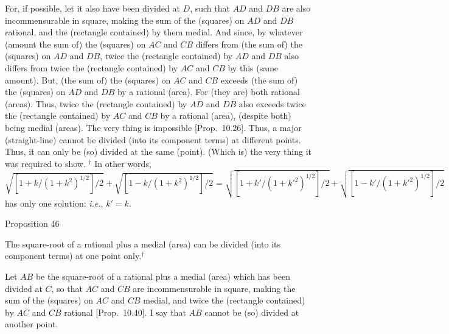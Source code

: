 For, if possible, let it also have been divided at $D$, such that $AD$ and
$DB$ are also incommensurable in square, making the
sum of the (squares) on $AD$ and $DB$ rational, and the (rectangle contained) by them medial. And since, by whatever (amount the sum of)
the (squares) on $AC$ and $CB$ differs from (the sum of) the (squares)
on $AD$ and $DB$, 
twice the (rectangle contained) by $AD$ and $DB$ also differs from
twice the (rectangle contained) by $AC$ and $CB$ by this (same amount). But, (the sum of) the
(squares) on $AC$ and $CB$ exceeds (the sum of) the (squares) on
$AD$ and $DB$ by a rational (area). For (they are) both rational (areas). Thus, twice the
(rectangle contained) by $AD$ and $DB$ also exceeds twice the
(rectangle contained) by $AC$ and $CB$ by a rational (area), (despite both) being medial (areas).
The very thing is impossible [Prop.~10.26].
Thus, a major (straight-line) cannot be divided (into its component terms) at different points. Thus,
it can only be (so) divided at the same (point). (Which is) the very thing it was required to show.
{\footnotesize\noindent$^\dag$ In other words, $\sqrt{[1+k/(1+k^2)^{1/2}]/2} + \sqrt{[1-k/(1+k^2)^{1/2}]/2} =\sqrt{[1+k'/(1+k'^2)^{1/2}]/2} + \sqrt{[1-k'/(1+k'^2)^{1/2}]/2}$ has only one solution: {\em i.e.}, $k'=k$.}


\begin{center}
{\large Proposition 46}
\end{center}
The square-root of a rational plus a  medial
(area) can be divided (into its component terms) at  one point only.$^\dag$

\epsfysize=0.3in
\centerline{}

Let $AB$ be the square-root of a rational plus a medial (area) which has
been divided at $C$, so that $AC$ and $CB$ are incommensurable
in square, making the sum of the (squares) on $AC$ and $CB$ medial,
and twice the (rectangle contained) by $AC$ and $CB$ rational
[Prop.~10.40]. I say that $AB$ cannot be (so)
divided at another point.

